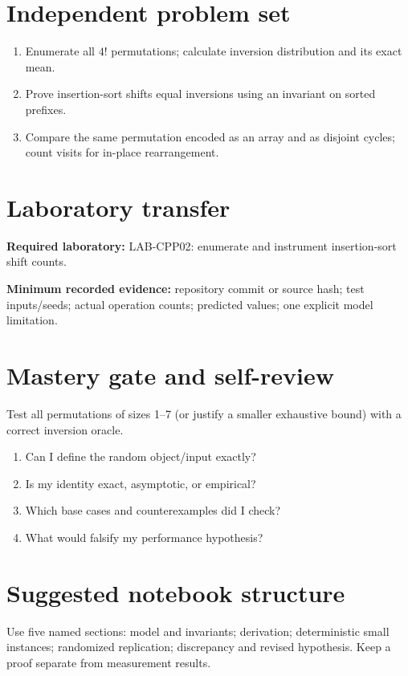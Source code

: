 \documentclass[11pt]{article}
\begin{document}
\section{Independent problem set}
\begin{enumerate}
\item Enumerate all $4!$ permutations; calculate inversion distribution and its exact mean.
\item Prove insertion-sort shifts equal inversions using an invariant on sorted prefixes.
\item Compare the same permutation encoded as an array and as disjoint cycles; count visits for in-place rearrangement.
\end{enumerate}
\section{Laboratory transfer}
\textbf{Required laboratory:} LAB-CPP02: enumerate and instrument insertion-sort shift counts.\par
\noindent\textbf{Minimum recorded evidence:} repository commit or source hash; test inputs/seeds; actual operation counts; predicted values; one explicit model limitation.\par
\section{Mastery gate and self-review}
Test all permutations of sizes 1--7 (or justify a smaller exhaustive bound) with a correct inversion oracle.\par
\begin{enumerate}\item Can I define the random object/input exactly? \item Is my identity exact, asymptotic, or empirical? \item Which base cases and counterexamples did I check? \item What would falsify my performance hypothesis?\end{enumerate}
\section{Suggested notebook structure}
Use five named sections: model and invariants; derivation; deterministic small instances; randomized replication; discrepancy and revised hypothesis. Keep a proof separate from measurement results.
\end{document}
